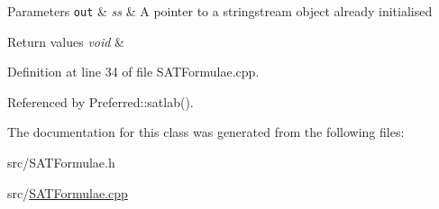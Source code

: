 \begin{DoxyParams}[1]{Parameters}
\mbox{\tt out}  & {\em ss} & A pointer to a stringstream object already initialised \\
\hline
\end{DoxyParams}

\begin{DoxyRetVals}{Return values}
{\em void} & \\
\hline
\end{DoxyRetVals}


Definition at line 34 of file S\-A\-T\-Formulae.\-cpp.



Referenced by Preferred\-::satlab().



The documentation for this class was generated from the following files\-:\begin{DoxyCompactItemize}
\item 
src/S\-A\-T\-Formulae.\-h\item 
src/\hyperlink{SATFormulae_8cpp}{S\-A\-T\-Formulae.\-cpp}\end{DoxyCompactItemize}
